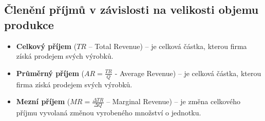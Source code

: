 \subsection{Členění příjmů v závislosti na velikosti objemu produkce}
\begin{itemize}
    \item \textbf{Celkový příjem} ($TR$ – Total Revenue) – je celková částka, 
    kterou firma získá prodejem svých výrobků.
    \item \textbf{Průměrný příjem} ($AR=\frac{TR}{Q}$ - Average Revenue) – je celková částka,
    kterou firma získá prodejem svých výrobků.
    \item \textbf{Mezní příjem} ($MR=\frac{\Delta TR}{\Delta Q}$ – Marginal Revenue) – je změna 
    celkového příjmu vyvolaná změnou vyrobeného množství o jednotku.
\end{itemize}